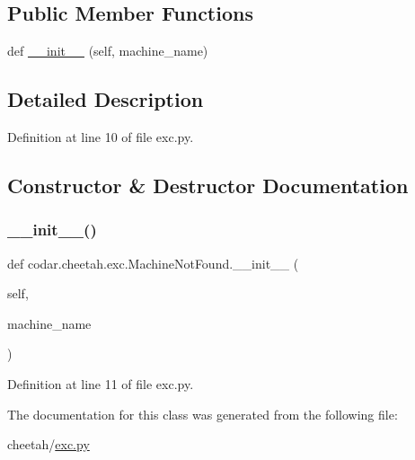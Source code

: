 \subsection*{Public Member Functions}
\begin{DoxyCompactItemize}
\item 
def \hyperlink{classcodar_1_1cheetah_1_1exc_1_1_machine_not_found_ae688c3fce79910a0bd7cd1e553be32cf}{\+\_\+\+\_\+init\+\_\+\+\_\+} (self, machine\+\_\+name)
\end{DoxyCompactItemize}


\subsection{Detailed Description}


Definition at line 10 of file exc.\+py.



\subsection{Constructor \& Destructor Documentation}
\mbox{\label{classcodar_1_1cheetah_1_1exc_1_1_machine_not_found_ae688c3fce79910a0bd7cd1e553be32cf}} 
\subsubsection{\texorpdfstring{\+\_\+\+\_\+init\+\_\+\+\_\+()}{\_\_init\_\_()}}
{\footnotesize\ttfamily def codar.\+cheetah.\+exc.\+Machine\+Not\+Found.\+\_\+\+\_\+init\+\_\+\+\_\+ (\begin{DoxyParamCaption}\item[{}]{self,  }\item[{}]{machine\+\_\+name }\end{DoxyParamCaption})}



Definition at line 11 of file exc.\+py.



The documentation for this class was generated from the following file\+:\begin{DoxyCompactItemize}
\item 
cheetah/\hyperlink{cheetah_2exc_8py}{exc.\+py}\end{DoxyCompactItemize}
